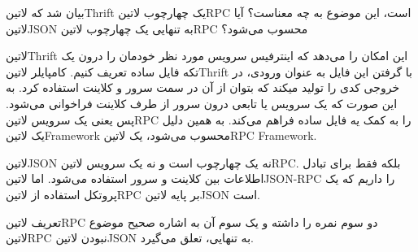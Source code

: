 
بیان شد که ‌لاتین{Thrift} یک چهارچوب ‌لاتین{RPC} است، این موضوع به چه معناست؟
آیا ‌لاتین{JSON} به تنهایی یک چهارچوب ‌لاتین{RPC} محسوب می‌شود؟



‌لاتین{Thrift} این امکان را می‌دهد که اینترفیس سرویس مورد نظر خودمان را درون یک تکه فایل ساده تعریف کنیم.
کامپایلر ‌لاتین{Thrift} با گرفتن این فایل به عنوان ورودی، در خروجی کدی را تولید میکند که بتوان از آن در سمت سرور و کلاینت استفاده کرد.
به این صورت که یک سرویس یا تابعی درون سرور از طرف کلاینت فراخوانی می‌شود. پس یعنی یک سرویس ‌لاتین{RPC} را به کمک یه فایل ساده فراهم می‌کند.
به همین دلیل یک ‌لاتین{Framework} محسوب می‌شود، یک ‌لاتین{RPC Framework}.

‌لاتین{JSON} نه یک چهارچوب است و نه یک سرویس ‌لاتین{RPC}. بلکه فقط برای تبادل اطلاعات بین کلاینت و سرور استفاده می‌شود. اما ‌لاتین{JSON-RPC} را داریم که یک پروتکل استفاده از ‌لاتین{RPC}
بر پایه ‌لاتین{JSON} است.

تعریف ‌لاتین{RPC} دو سوم نمره را داشته و یک سوم آن به اشاره صحیح موضوع ‌لاتین{RPC} نبودن ‌لاتین{JSON} به تنهایی، تعلق می‌گیرد.

